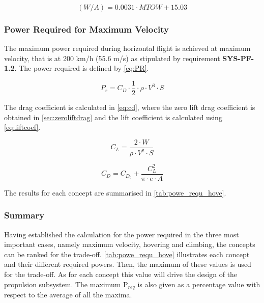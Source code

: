 \begin{equation}
\label{eq:disk_load}
(W/A) = 0.0031 \cdot MTOW + 15.03
\end{equation}



\subsubsection{Power Required for Maximum Velocity}

The maximum power required during horizontal flight is achieved at maximum velocity, that is at 200 km/h (55.6 m/s) as stipulated by requirement \textbf{SYS-PF-1.2}. The power required is defined by \autoref{eq:PR}.

\begin{equation}
    P_{r} = C_D\cdot \frac{1}{2}\cdot\rho \cdot V^3\cdot S
    \label{eq:PR}
\end{equation}

The drag coefficient is calculated in \autoref{eq:cd}, where the zero lift drag coefficient is obtained in \autoref{sec:zeroliftdrag} and the lift coefficient is calculated using \autoref{eq:liftcoef}. 

\begin{equation}
    C_L = \frac{2\cdot W}{\rho \cdot V^2\cdot S}
    \label{eq:liftcoef}
\end{equation}

\begin{equation}
    C_D = C_{D_0} + \frac{C_L^2}{\pi \cdot e\cdot A}
    \label{eq:cd}
\end{equation}

The results for each concept are summarised in \autoref{tab:powe_requ_hove}.

\subsubsection{Summary}

Having established the calculation for the power required in the three most important cases, namely maximum velocity, hovering and climbing, the concepts can be ranked for the trade-off. \autoref{tab:powe_requ_hove} illustrates each concept and their different required powers. Then, the maximum of these values is used for the trade-off. As for each concept this value will drive the design of the propulsion subsystem. The maximum P$_{req}$ is also given as a percentage value with respect to the average of all the maxima.

